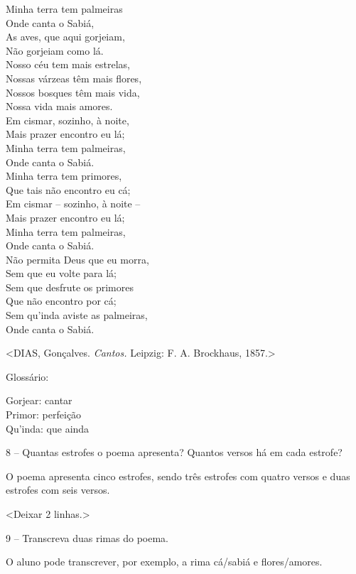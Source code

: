 Minha terra tem palmeiras\\
Onde canta o Sabiá,\\
As aves, que aqui gorjeiam,\\
Não gorjeiam como lá.\\[2\baselineskip]Nosso céu tem mais estrelas,\\
Nossas várzeas têm mais flores,\\
Nossos bosques têm mais vida,\\
Nossa vida mais amores.\\[2\baselineskip]Em cismar, sozinho, à noite,\\
Mais prazer encontro eu lá;\\
Minha terra tem palmeiras,\\
Onde canta o Sabiá.\\[2\baselineskip]Minha terra tem primores,\\
Que tais não encontro eu cá;\\
Em cismar -- sozinho, à noite --\\
Mais prazer encontro eu lá;\\
Minha terra tem palmeiras,\\
Onde canta o Sabiá.\\[2\baselineskip]Não permita Deus que eu morra,\\
Sem que eu volte para lá;\\
Sem que desfrute os primores\\
Que não encontro por cá;\\
Sem qu'inda aviste as palmeiras,\\
Onde canta o Sabiá.

\textless{}DIAS, Gonçalves. \emph{Cantos.} Leipzig: F. A. Brockhaus,
1857.\textgreater{}

Glossário:

Gorjear: cantar\\
Primor: perfeição\\
Qu'inda: que ainda

8 -- Quantas estrofes o poema apresenta? Quantos versos há em cada
estrofe?

O poema apresenta cinco estrofes, sendo três estrofes com quatro versos
e duas estrofes com seis versos.

\textless{}Deixar 2 linhas.\textgreater{}

9 -- Transcreva duas rimas do poema.

O aluno pode transcrever, por exemplo, a rima cá/sabiá e flores/amores.

